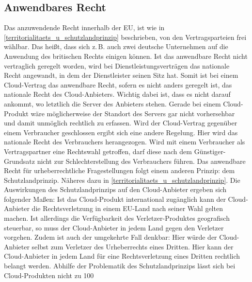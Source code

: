 \subsection{Anwendbares Recht}
Das anzuwendende Recht innerhalb der EU, ist wie in \vref{territorialitaets_u_schutzlandprinzip} beschrieben, von den Vertragsparteien frei w\"ahlbar. Das hei{\ss}t, dass sich z.\,B. auch zwei deutsche Unternehmen auf die Anwendung des britischen Rechts einigen k\"onnen. Ist das anwendbare Recht nicht vertraglich geregelt worden, wird bei Dienstleistungsvertr\"agen das nationale Recht angewandt, in dem der Dienstleister seinen Sitz hat. Somit ist bei einem {\glqq}Cloud-Vertrag{\grqq} das anwendbare Recht, sofern es nicht anders geregelt ist,  das nationale Recht des Cloud-Anbieters. Wichtig dabei ist, dass es nicht darauf ankommt, wo letztlich die Server des Anbieters stehen. Gerade bei einem Cloud-Produkt w\"are m\"oglicherweise der Standort des Servers gar nicht vorhersehbar und damit unm\"oglich rechtlich zu erfassen.\newline
Wird der {\glqq}Cloud-Vertrag{\grqq} gegen\"uber einem Verbraucher geschlossen ergibt sich eine andere Regelung. Hier wird das nationale Recht des Verbrauchers herangezogen. Wird mit einem Verbraucher als Vertragspartner eine Rechtswahl getroffen, darf diese nach dem G\"unstiger-Grundsatz nicht zur Schlechterstellung des Verbrauchers f\"uhren.
Das anwendbare Recht f\"ur urheberrechtliche Fragestellungen folgt einem anderen Prinzip: dem Schutzlandprinzip. N\"aheres dazu in \vref{territorialitaets_u_schutzlandprinzip}.\newline
Die Auswirkungen des Schutzlandprinzips auf den  Cloud-Anbieter ergeben sich folgender Ma{\ss}en:\newline
Ist das Cloud-Produkt international zug\"anglich kann der Cloud-Anbieter die Rechtsverletzung in einem EU-Land nach seiner Wahl gelten machen. Ist allerdings die Verf\"ugbarkeit des Verletzer-Produktes geografisch steuerbar, so muss der Cloud-Anbieter in jedem Land gegen den Verletzer vorgehen. \newline
Zudem ist auch der umgekehrte Fall denkbar: Hier w\"urde der Cloud-Anbieter selbst zum Verletzer des Urheberrechts eines Dritten. Hier kann der Cloud-Anbieter in jedem Land f\"ur eine Rechtsverletzung eines Dritten rechtlich belangt werden. Abhilfe der Problematik des Schutzlandprinzips l\"asst sich bei Cloud-Produkten nicht zu 100%
